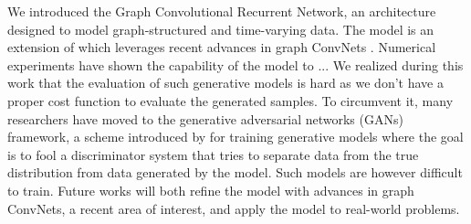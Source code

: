 \documentclass{article} %
\newcommand{\todo}[1]{{\color{red} #1 }}
\begin{document}
We introduced the Graph Convolutional Recurrent Network, an architecture
designed to model graph-structured and time-varying data. The model is an
extension of \citet{convlstm} which leverages recent advances in graph ConvNets
\citep{gcnn}. Numerical experiments have shown the capability of the model
\todo{to ...}
We realized during this work that the evaluation of such generative models is hard as we don't have a proper cost function to evaluate the generated samples. To circumvent it, many researchers have moved to the generative adversarial networks (GANs) framework, a scheme introduced by \citet{gan} for training generative models where the goal is to fool a discriminator system that tries to separate data from the true distribution from data generated by the model. Such models are however difficult to train.
Future works will both refine the model with advances in graph ConvNets, a recent area of interest, and apply the model to real-world problems.


\newpage


\end{document}
